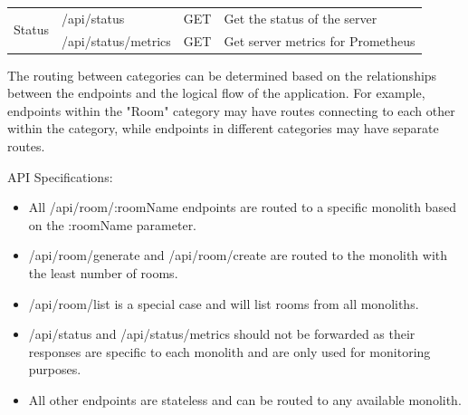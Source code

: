 \begin{table}[htbp]
\begin{tabular}{|c|l|c|p{5.5cm}|}
    \hline
    \multirow{2}{*}{Status} & /api/status                     & GET                & Get the status of the server                                                                                      \\
    \cline{2-4}
                            & /api/status/metrics             & GET                & Get server metrics for Prometheus                                                                                 \\
    \hline
  \end{tabular}
\end{table}

The routing between categories can be determined based on the relationships between the endpoints and the logical flow of the application. For example, endpoints within the "Room" category may have routes connecting to each other within the category, while endpoints in different categories may have separate routes.

API Specifications:
\begin{itemize}
  \item All /api/room/:roomName endpoints are routed to a specific monolith based on the :roomName parameter.
  \item /api/room/generate and /api/room/create are routed to the monolith with the least number of rooms.
  \item /api/room/list is a special case and will list rooms from all monoliths.
  \item /api/status and /api/status/metrics should not be forwarded as their responses are specific to each monolith and are only used for monitoring purposes.
  \item All other endpoints are stateless and can be routed to any available monolith.
\end{itemize}